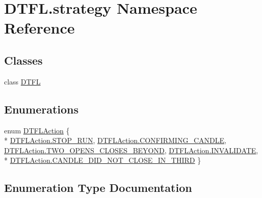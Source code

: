 \hypertarget{namespace_d_t_f_l_1_1strategy}{}\section{D\+T\+F\+L.\+strategy Namespace Reference}
\label{namespace_d_t_f_l_1_1strategy}
\subsection*{Classes}
\begin{DoxyCompactItemize}
\item 
class \hyperlink{class_d_t_f_l_1_1strategy_1_1_d_t_f_l}{D\+T\+FL}
\end{DoxyCompactItemize}
\subsection*{Enumerations}
\begin{DoxyCompactItemize}
\item 
enum \hyperlink{namespace_d_t_f_l_1_1strategy_a2e9c5b33f52ebf74eaa38a23af10120e}{D\+T\+F\+L\+Action} \{ \\*
\hyperlink{namespace_d_t_f_l_1_1strategy_a2e9c5b33f52ebf74eaa38a23af10120eabc84b43e2f0d6acd5b2ff09d5433243f}{D\+T\+F\+L\+Action.\+S\+T\+O\+P\+\_\+\+R\+UN}, 
\hyperlink{namespace_d_t_f_l_1_1strategy_a2e9c5b33f52ebf74eaa38a23af10120eacf589a60b4a17b263842cc0c2fc87cd2}{D\+T\+F\+L\+Action.\+C\+O\+N\+F\+I\+R\+M\+I\+N\+G\+\_\+\+C\+A\+N\+D\+LE}, 
\hyperlink{namespace_d_t_f_l_1_1strategy_a2e9c5b33f52ebf74eaa38a23af10120ea32052dbc5bc67c6281341f52f28e8a82}{D\+T\+F\+L\+Action.\+T\+W\+O\+\_\+\+O\+P\+E\+N\+S\+\_\+\+C\+L\+O\+S\+E\+S\+\_\+\+B\+E\+Y\+O\+ND}, 
\hyperlink{namespace_d_t_f_l_1_1strategy_a2e9c5b33f52ebf74eaa38a23af10120eac7ba4bde5fe21a5ad38e8ddb71e2ae2a}{D\+T\+F\+L\+Action.\+I\+N\+V\+A\+L\+I\+D\+A\+TE}, 
\\*
\hyperlink{namespace_d_t_f_l_1_1strategy_a2e9c5b33f52ebf74eaa38a23af10120ea82f68cb290e6eb908fc1d83f050ce976}{D\+T\+F\+L\+Action.\+C\+A\+N\+D\+L\+E\+\_\+\+D\+I\+D\+\_\+\+N\+O\+T\+\_\+\+C\+L\+O\+S\+E\+\_\+\+I\+N\+\_\+\+T\+H\+I\+RD}
 \}
\end{DoxyCompactItemize}


\subsection{Enumeration Type Documentation}
